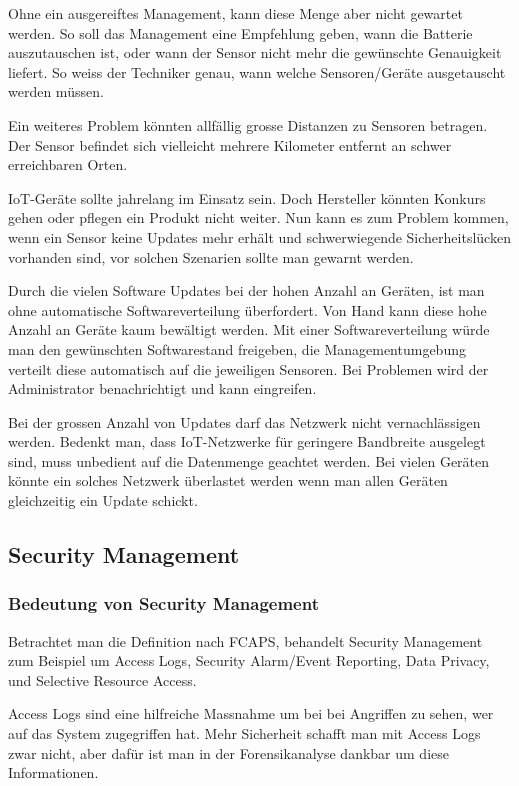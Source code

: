 Ohne ein ausgereiftes Management, kann diese Menge aber nicht gewartet werden. So soll das Management eine Empfehlung geben, wann die Batterie auszutauschen ist, oder wann der Sensor nicht mehr die gewünschte Genauigkeit liefert. So weiss der Techniker genau, wann welche Sensoren/Geräte ausgetauscht werden müssen.

Ein weiteres Problem könnten allfällig grosse Distanzen zu Sensoren betragen. Der Sensor befindet sich vielleicht mehrere Kilometer entfernt an schwer erreichbaren Orten.

IoT-Geräte sollte jahrelang im Einsatz sein. Doch Hersteller könnten Konkurs gehen oder pflegen ein Produkt nicht weiter. Nun kann es zum Problem kommen, wenn ein Sensor keine Updates mehr erhält und schwerwiegende Sicherheitslücken vorhanden sind, vor solchen Szenarien sollte man gewarnt werden. 

Durch die vielen Software Updates bei der hohen Anzahl an Geräten, ist man ohne automatische Softwareverteilung überfordert. Von Hand kann diese hohe Anzahl an Geräte kaum bewältigt werden. Mit einer Softwareverteilung würde man den gewünschten Softwarestand freigeben, die Managementumgebung verteilt diese automatisch auf die jeweiligen Sensoren. Bei Problemen wird der Administrator benachrichtigt und kann eingreifen.

Bei der grossen Anzahl von Updates darf das Netzwerk nicht vernachlässigen werden. Bedenkt man, dass IoT-Netzwerke für geringere Bandbreite ausgelegt sind, muss unbedient auf die Datenmenge geachtet werden. Bei vielen Geräten könnte ein solches Netzwerk überlastet werden wenn man allen Geräten gleichzeitig ein Update schickt.
\subsection{Security Management}
\subsubsection{Bedeutung von Security Management}
Betrachtet man die Definition nach FCAPS, behandelt Security Management zum Beispiel um Access Logs, Security Alarm/Event Reporting, Data Privacy, und Selective Resource Access.

Access Logs sind eine hilfreiche Massnahme um bei bei Angriffen zu sehen, wer auf das System zugegriffen hat. Mehr Sicherheit schafft man mit Access Logs zwar nicht, aber dafür ist man in der Forensikanalyse dankbar um diese Informationen.

